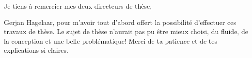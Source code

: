 \thispagestyle{preface}

Je tiens à remercier mes deux directeurs de thèse,
	
Gerjan Hagelaar, pour m'avoir tout d'abord offert la possibilité d'effectuer ces travaux de thèse.
Le sujet de thèse n'aurait pas pu être mieux choisi, du fluide, de la conception et une belle problématique!
Merci de ta patience et de tes explications si claires. 
